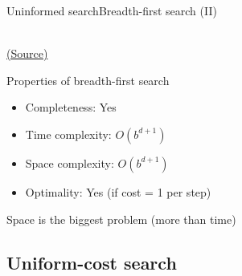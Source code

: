\documentclass[10pt,compress]{beamer} %
\begin{document}
\begin{frame}{Uninformed search}{Breadth-first search (II)}
      \begin{center}
          \setlength{\fboxrule}{0pt}
           \\
          \tiny{\href{http://aima.cs.berkeley.edu/index.html}{(Source)}}
      \end{center}

      \bigskip
      Properties of breadth-first search
      \begin{itemize}
        \item Completeness: Yes
        \item Time complexity: $O(b^{d+1})$
        \item Space complexity: $O(b^{d+1})$
        \item Optimality: Yes (if cost = 1 per step)
      \end{itemize}
      Space is the biggest problem (more than time)
\end{frame}

\subsection{Uniform-cost search}
\end{document}
